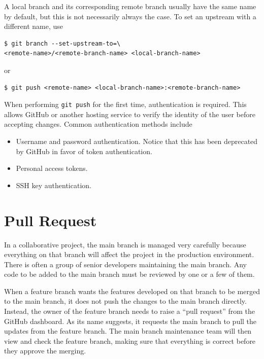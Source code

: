 \begin{shortbox}

A local branch and its corresponding remote branch usually have the same name by default, but this is not necessarily always the case. To set an upstream with a different name, use
\begin{lstlisting}
$ git branch --set-upstream-to=\
<remote-name>/<remote-branch-name> <local-branch-name>
\end{lstlisting}
or
\begin{lstlisting}
$ git push <remote-name> <local-branch-name>:<remote-branch-name>
\end{lstlisting}

\end{shortbox}

When performing \texttt{git push} for the first time, authentication is required. This allows GitHub or another hosting service to verify the identity of the user before accepting changes. Common authentication methods include
\begin{itemize}
    \item Username and password authentication. Notice that this has been deprecated by GitHub in favor of token authentication.
    \item Personal access tokens.
    \item SSH key authentication.
\end{itemize}

\section{Pull Request} \label{sec:pull_request}

In a collaborative project, the main branch is managed very carefully because everything on that branch will affect the project in the production environment. There is often a group of senior developers maintaining the main branch. Any code to be added to the main branch must be reviewed by one or a few of them.

When a feature branch wants the features developed on that branch to be merged to the main branch, it does not push the changes to the main branch directly. Instead, the owner of the feature branch needs to raise a ``pull request'' from the GitHub dashboard. As its name suggests, it requests the main branch to pull the updates from the feature branch. The main branch maintenance team will then view and check the feature branch, making sure that everything is correct before they approve the merging.

